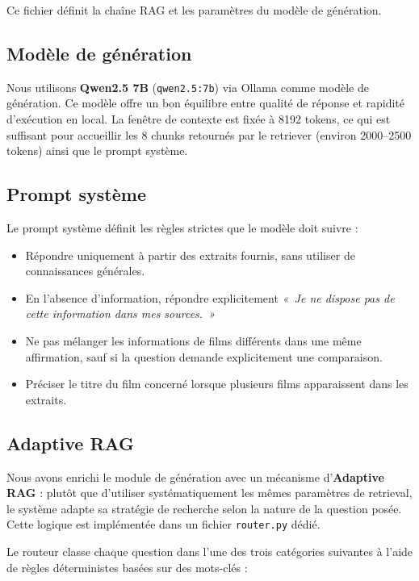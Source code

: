 \documentclass[11pt]{report}
\begin{document}
    Ce fichier définit la chaîne RAG et les paramètres du modèle de génération.

    \subsection{Modèle de génération}

    Nous utilisons \textbf{Qwen2.5 7B} (\texttt{qwen2.5:7b}) via Ollama comme modèle de génération. Ce modèle offre un bon équilibre entre qualité de réponse et rapidité d'exécution en local. La fenêtre de contexte est fixée à 8192 tokens, ce qui est suffisant pour accueillir les 8 chunks retournés par le retriever (environ 2000--2500 tokens) ainsi que le prompt système.

    \subsection{Prompt système}

    Le prompt système définit les règles strictes que le modèle doit suivre :
    \begin{itemize}
        \item Répondre uniquement à partir des extraits fournis, sans utiliser de connaissances générales.
        \item En l'absence d'information, répondre explicitement \textit{«~Je ne dispose pas de cette information dans mes sources.~»}
        \item Ne pas mélanger les informations de films différents dans une même affirmation, sauf si la question demande explicitement une comparaison.
        \item Préciser le titre du film concerné lorsque plusieurs films apparaissent dans les extraits.
    \end{itemize}

    \subsection{Adaptive RAG}

    Nous avons enrichi le module de génération avec un mécanisme d'\textbf{Adaptive RAG} : plutôt que d'utiliser systématiquement les mêmes paramètres de retrieval, le système adapte sa stratégie de recherche selon la nature de la question posée. Cette logique est implémentée dans un fichier \texttt{router.py} dédié.

    Le routeur classe chaque question dans l'une des trois catégories suivantes à l'aide de règles déterministes basées sur des mots-clés :
\end{document}
